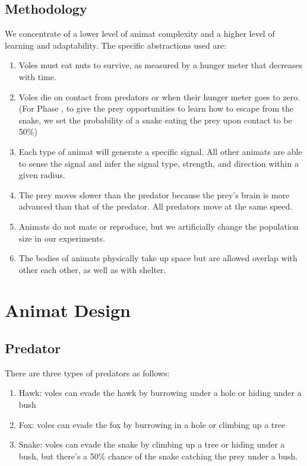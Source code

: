 \documentclass[10pt,conference,letterpaper,doublecolumn]{IEEEtran}
\begin{document}
\subsection{Methodology}
We concentrate of a lower level of animat complexity and a higher level of learning and adaptability. The specific abstractions used are: 
\begin{enumerate}
\item Voles must eat nuts to survive, as measured by a hunger meter that decreases with time. 
\item Voles die on contact from predators or when their hunger meter goes to zero. (For Phase \uppercase\expandafter{}, to give the prey opportunities to learn how to escape from the snake, we set the probability of a snake eating the prey upon contact to be 50\%) 
\item Each type of animat will generate a specific signal. All other animats are able to sense the signal and infer the signal type, strength, and direction within a given radius.
\item The prey moves slower than the predator because the prey’s brain is more advanced than that of the predator. All predators move at the same speed. 
\item Animats do not mate or reproduce, but we artificially change the population size in our experiments. 
\item The bodies of animats physically take up space but are allowed overlap with other each other, as well as with shelter.
\end{enumerate}

\section{Animat Design}
\subsection{Predator}
There are three types of predators as follows: 
\begin{enumerate}
\item Hawk: voles can evade the hawk by burrowing under a hole or hiding under a bush
\item Fox: voles can evade the fox by burrowing in a hole or climbing up a tree
\item Snake: voles can evade the snake by climbing up a tree or hiding under a bush, but there’s a 50\% chance of the snake catching the prey under a bush.
\end{enumerate}
\end{document}
